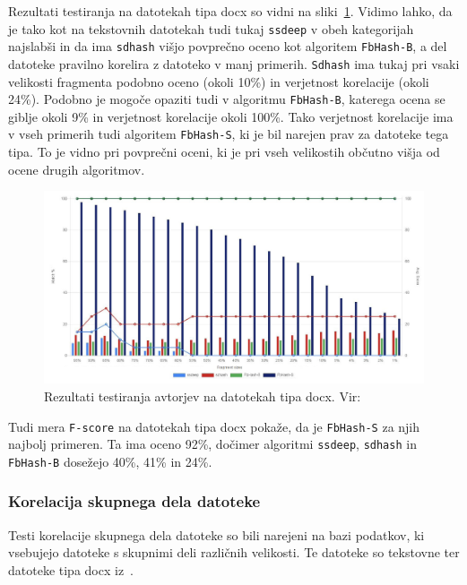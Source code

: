 \documentclass{acm_proc_article-sp}
\begin{document}
Rezultati testiranja na datotekah tipa docx so vidni na sliki~\ref{fig:fd-docx-rez}. Vidimo lahko, da je tako kot na tekstovnih datotekah tudi tukaj \texttt{ssdeep} v obeh kategorijah najslabši in da ima  \texttt{sdhash} višjo povprečno oceno kot algoritem \texttt{FbHash-B}, a del datoteke pravilno korelira z datoteko v manj primerih. \texttt{Sdhash} ima tukaj pri vsaki velikosti fragmenta podobno oceno (okoli 10\%) in verjetnost korelacije (okoli 24\%). Podobno je mogoče opaziti tudi v algoritmu \texttt{FbHash-B}, katerega ocena se giblje okoli 9\% in verjetnost korelacije okoli 100\%. Tako verjetnost korelacije ima v vseh primerih tudi algoritem \texttt{FbHash-S}, ki je bil narejen prav za datoteke tega tipa. To je vidno pri povprečni oceni, ki je pri vseh velikostih občutno višja od ocene drugih algoritmov.

\begin{figure}[htb]
\begin{center}
\includegraphics[width=1\columnwidth]{frag_det_docx.png}
\end{center}
\caption{\small{Rezultati testiranja avtorjev na datotekah tipa docx. Vir:~\cite{fbhash}}}
\label{fig:fd-docx-rez}
\end{figure}

Tudi mera \texttt{F-score} na datotekah tipa docx pokaže, da je \texttt{FbHash-S} za njih najbolj primeren. Ta ima oceno 92\%, dočimer algoritmi \texttt{ssdeep}, \texttt{sdhash} in \texttt{FbHash-B} dosežejo 40\%, 41\% in 24\%.

\subsubsection{Korelacija skupnega dela datoteke}

Testi korelacije skupnega dela datoteke so bili narejeni na bazi podatkov, ki vsebujejo datoteke s skupnimi deli različnih velikosti. Te datoteke so tekstovne ter datoteke tipa docx iz~\cite{zdataset}. 
\end{document}
